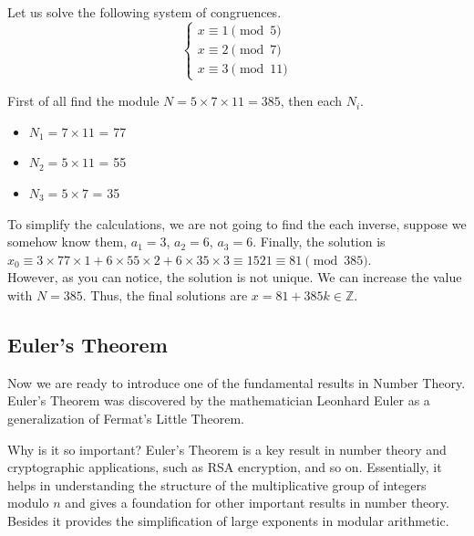 \documentclass[../lecture-notes-148x210.tex]{subfiles}
\begin{document}
\begin{example}
    Let us solve the following system of congruences.
    \begin{equation*}    
        \begin{cases}
            x \equiv 1 \pmod{5} \\
            x \equiv 2 \pmod{7} \\
            x \equiv 3 \pmod{11}
        \end{cases}
    \end{equation*}

    First of all find the module $N = 5 \times 7 \times 11 = 385$, then each $N_i$. \\
    \vspace{-7mm}
    \begin{multicols*}{2}    
        \begin{itemize}
            \item $N_1 = 7 \times 11$ = 77
            \item $N_2 = 5 \times 11$ = 55
            \item $N_3 = 5 \times 7$ = 35
        \end{itemize}
    \end{multicols*}
    \vspace{-3mm}

    To simplify the calculations, we are not going to find the each inverse, suppose 
    we somehow know them, $a_1 = 3$, $a_2 = 6$, $a_3 = 6$.
    Finally, the solution is $x_0 \equiv 3 \times 77 \times 1 + 6 \times 55 \times 2 + 6 \times 35 \times 3 \equiv 1521 \equiv 81 \pmod{385}$.
    \\
    
    However, as you can notice, the solution is not unique. We can increase the value with $N = 385$.
    Thus, the final solutions are $x = 81 + 385k \in \mathbb{Z}$.

\end{example}

\subsection{Euler's Theorem}
Now we are ready to introduce one of the fundamental results in Number Theory.
Euler's Theorem was discovered by the mathematician Leonhard Euler 
as a generalization of Fermat's Little Theorem.

Why is it so important? Euler's Theorem is a key result in number theory and 
cryptographic applications, such as RSA encryption, and so on. 
Essentially, it helps in understanding the structure of the multiplicative group of 
integers modulo $n$ and gives a foundation for other important results in number theory. 
Besides it provides the simplification of large exponents in modular arithmetic. 
\end{document}
